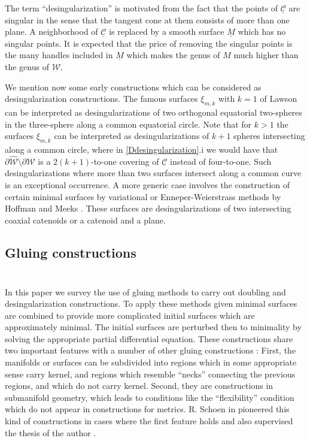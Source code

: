 \documentclass[12pt,namelimits,sumlimits]{amsart}
\theoremstyle{remark}
\numberwithin{equation}{section}
\begin{document}
The term ``desingularization'' is motivated from the fact that the points of ${\underline{{\mathcal{C}}}}$
are singular in the sense that the tangent cone at them consists of more than one plane.
A neighborhood of ${\underline{{\mathcal{C}}}}$ is replaced by a smooth surface $\underline{M}$ which has no singular points.
It is expected that the price of removing the singular points is the many handles
included in $\underline{M}$
which makes the genus of $M$ much higher than the genus of ${{\mathcal{W}}}$.

We mention now some
early constructions which can be considered as desingularization constructions.
The famous surfaces $\xi_{m,k}$ with $k=1$ of Lawson \cite{L2} can be interpreted as desingularizations
of two orthogonal equatorial two-spheres in the three-sphere along a common equatorial circle.
Note that for $k>1$ the surfaces $\xi_{m,k}$ can be interpreted as desingularizations of $k+1$
spheres intersecting along a common circle, where in \ref{Ddesingularization}.i
we would have that
$\partial{{\widehat{{\mathcal{W}}}}}\setminus\partial{{\mathcal{W}}}$ is a $2(k+1)$-to-one covering of ${\underline{{\mathcal{C}}}}$ instead of four-to-one.
Such desingularizations where more than two surfaces intersect along a common curve is an exceptional occurrence.
A more generic case involves the construction of
certain minimal surfaces by variational or Enneper-Weierstrass methods
by Hoffman and Meeks \cite{HM2,HM3,HM5,HK}.
These surfaces are desingularizations of two intersecting coaxial catenoids or a catenoid and a plane.

\subsection*{Gluing constructions}
$\phantom{ab}$
\nopagebreak

In this paper we survey the use of gluing methods to carry out 
doubling and desingularization constructions.
To apply these methods given minimal surfaces are combined to provide
more complicated initial surfaces which are approximately minimal.
The initial surfaces are perturbed then to minimality by solving 
the appropriate partial differential equation.
These constructions share two important features with a number of other gluing constructions
\cite{kapouleas:annals,kapouleas:jdg,kapouleas:drops,kapouleas:wente,haskins:kapouleas:invent,haskins:kapouleas:survey}:
First, the manifolds or surfaces can be subdivided 
into regions which in some appropriate sense carry kernel,
and regions which resemble ``necks'' connecting the previous regions,
and which do not carry kernel.
Second, they are constructions in submanifold geometry, which leads to conditions
like the ``flexibility'' condition 
which do not appear in constructions for metrics.
R. Schoen in \cite{schoen} pioneered this kind of constructions in cases where the first feature holds
and also supervised the thesis of the author \cite{kapouleas:annals,kapouleas:jdg}.
\end{document}
